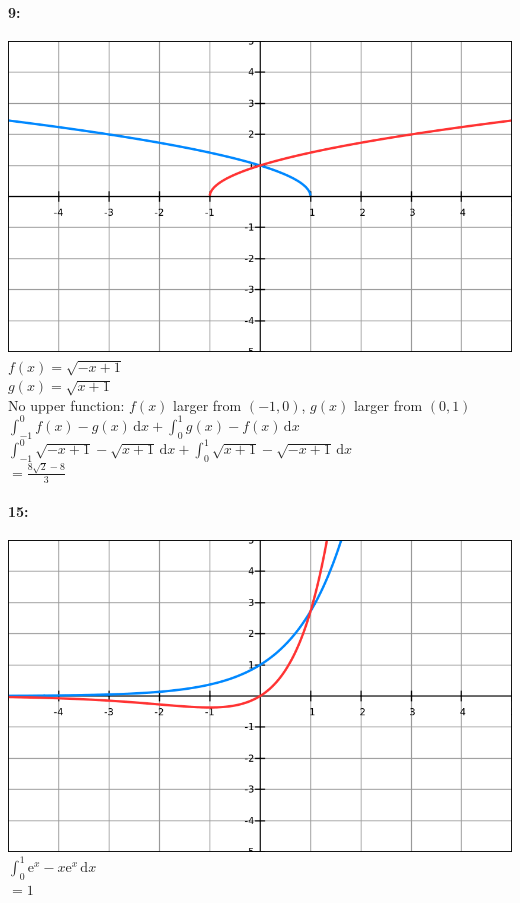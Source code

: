 \documentclass[12pt]{article}
\newcommand{\me}{\mathrm{e}}
\newcommand{\dx}{\mathrm{d}x}
\begin{document}
    \paragraph*{9:\\}
    \includegraphics[scale=.666]{9.png}\\
    $f(x) = \sqrt{-x+1}$\\
    $g(x) = \sqrt{x+1}$\\
    No upper function:
    $f(x)$ larger from $(-1, 0)$, $g(x)$ larger from $(0, 1)$\\
    $\int_{-1}^{0} \! f(x) - g(x) \, \dx + \int_{0}^{1} \! g(x) - f(x) \, \dx$\\
    $\int_{-1}^{0} \! \sqrt{-x+1} - \sqrt{x+1} \, \dx + \int_{0}^{1} \! \sqrt{x+1} - \sqrt{-x+1} \, \dx$\\
    $= \frac{8\sqrt{2} - 8}{3}$\\
    \paragraph*{15:\\}
    \includegraphics[scale=.666]{15.png}\\
    $\int_{0}^{1} \! \me^x - x\me^x \, \dx$\\
    $= 1$\\
\end{document}
